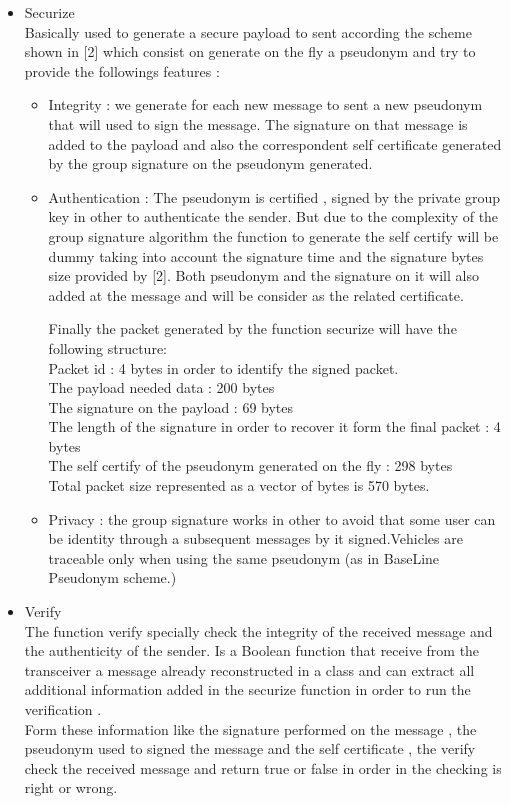 \begin{itemize}

\item Securize\\
Basically used to generate a secure payload to sent according the scheme shown in [2] which consist on generate on the fly a pseudonym and try to provide the followings features :
\begin{itemize}
\item Integrity : we generate for each new message  to sent a new pseudonym that will used to sign the message. The signature on that message is added to the payload and also the correspondent self certificate generated by the group signature on the pseudonym generated. 
\item Authentication : The pseudonym  is  certified , signed by the private group key in other to authenticate the sender. But due to the complexity of the group signature algorithm the function to generate the self certify will be dummy taking into account the signature time and the signature bytes size provided by [2]. Both pseudonym  and the signature on it will also added at the message and will be consider as the related certificate.

Finally the packet generated by the function securize will have the following structure:\\
    Packet id : 4 bytes in order to identify the signed packet.\\
    The payload needed data : 200 bytes \\
    The signature on the payload : 69 bytes\\
    The length of the signature in order to recover it form the final packet : 4 bytes\\
    The self certify of the pseudonym generated on the fly : 298 bytes\\
  Total packet size represented as a vector of bytes is 570 bytes.\\
\item Privacy : the group signature works in other to avoid that some user can be identity through a subsequent messages by it signed.Vehicles are traceable only when using the same pseudonym (as in BaseLine Pseudonym scheme.) 
\end{itemize}

\item Verify\\
The function verify specially check the integrity of the received message and the authenticity of the sender.
Is a Boolean function that receive from the transceiver a message already reconstructed in a class and can extract all additional  information added in the securize  function in order to run the verification .\\
Form these information like the signature performed on the message , the pseudonym  used to signed the message and the self certificate , the verify check  the received message and return true or false in order in the checking is right or wrong.


\end{itemize}
